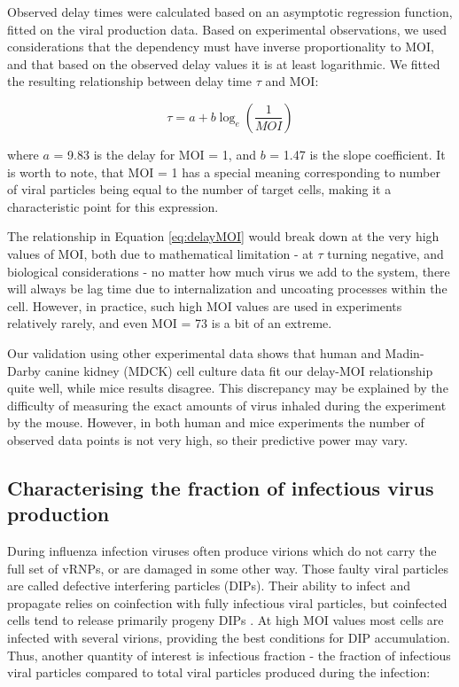 Observed delay times were calculated based on an asymptotic regression function, fitted on the viral production data. Based on experimental observations, we used considerations that the dependency must have inverse proportionality to MOI, and that based on the observed delay values it is at least logarithmic. We fitted the resulting relationship between delay time $\tau$ and MOI:

\begin{equation}
\tau = a + b \log_e (\frac{1}{MOI})
\label{eq:delayMOI}
\end{equation}

where $a$ = 9.83 is the delay for MOI = 1, and $b$ = 1.47 is the slope coefficient. It is worth to note, that MOI = 1 has a special meaning corresponding to number of viral particles being equal to the number of target cells, making it a characteristic point for this expression.

The relationship in Equation \ref{eq:delayMOI} would break down at the very high values of MOI, both due to mathematical limitation - at $\tau$ turning negative, and biological considerations - no matter how much virus we add to the system, there will always be lag time due to internalization and uncoating processes within the cell. However, in practice, such high MOI values are used in experiments relatively rarely, and even MOI = 73 is a bit of an extreme.

Our validation using other experimental data shows that human and Madin-Darby canine kidney (MDCK) cell culture data fit our delay-MOI relationship quite well, while mice results disagree. This discrepancy may be explained by the difficulty of measuring the exact amounts of virus inhaled during the experiment by the mouse. However, in both human and mice experiments the number of observed data points is not very high, so their predictive power may vary.

\subsection{Characterising the fraction of infectious virus production}

During influenza infection viruses often produce virions which do not carry the full set of vRNPs, or are damaged in some other way. Those faulty viral particles are called defective interfering particles (DIPs). Their ability to infect and propagate relies on coinfection with fully infectious viral particles, but coinfected cells tend to release primarily progeny DIPs \cite{frensing2014impact}. At high MOI values most cells are infected with several virions, providing the best conditions for DIP accumulation. Thus, another quantity of interest is infectious fraction - the fraction of infectious viral particles compared to total viral particles produced during the infection:

